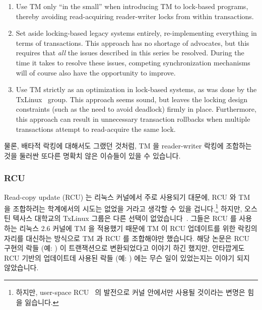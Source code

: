 \begin{enumerate}
\item	Use TM only ``in the small'' when introducing TM to lock-based
	programs, thereby avoiding read-acquiring reader-writer locks
	from within transactions.
\item	Set aside locking-based legacy systems entirely, re-implementing
	everything in terms of transactions.
	This approach has no shortage of advocates, but this requires
	that \emph{all} the issues described in this series be resolved.
	During the time it takes to resolve these issues, competing
	synchronization mechanisms will of course also have the
	opportunity to improve.
\item	Use TM strictly as an optimization in lock-based systems, as was
	done by the TxLinux~\cite{ChistopherJRossbach2007a} group.
	This approach seems sound, but leaves the locking design
	constraints (such as the need to avoid deadlock) firmly in place.
	Furthermore, this approach can result in unnecessary transaction
	rollbacks when multiple transactions attempt to read-acquire
	the same lock.
\fi
\end{enumerate}

물론, 배타적 락킹에 대해서도 그랬던 것처럼, TM 을 reader-writer 락킹에 조합하는
것을 둘러싼 또다른 명확치 않은 이슈들이 있을 수 있습니다.

\subsubsection{RCU}
\label{sec:future:RCU}

Read-copy update (RCU) 는 리눅스 커널에서 주로 사용되기 대문에, RCU 와 TM 을
조합하려는 학계에서의 시도는 없었을 거라고 생각할 수 있을 겁니다.\footnote{
	하지만, user-space
	RCU~\cite{MathieuDesnoyers2009URCU,MathieuDesnoyers2012URCU} 의
	발전으로 커널 안에서만 사용될 것이라는 변명은 힘을 잃습니다.}
하지만, 오스틴 텍사스 대학교의 TxLinux 그룹은 다른 선택이
없었습니다~\cite{ChistopherJRossbach2007a}.
그들은 RCU 를 사용하는 리눅스 2.6 커널에 TM 을 적용했기 때문에 TM 이 RCU
업데이트를 위한 락킹의 자리를 대신하는 방식으로 TM 과 RCU 를 조합해야만
했습니다.
해당 논문은 RCU 구현의 락들 (예: ) 이 트랜잭션으로
변환되었다고 이야기 하긴 했지만, 안타깝게도 RCU 기반의 업데이트데 사용된 락들
(예: ) 에는 무슨 일이 있었는지는 이야기 되지 않았습니다.
\iffalse

